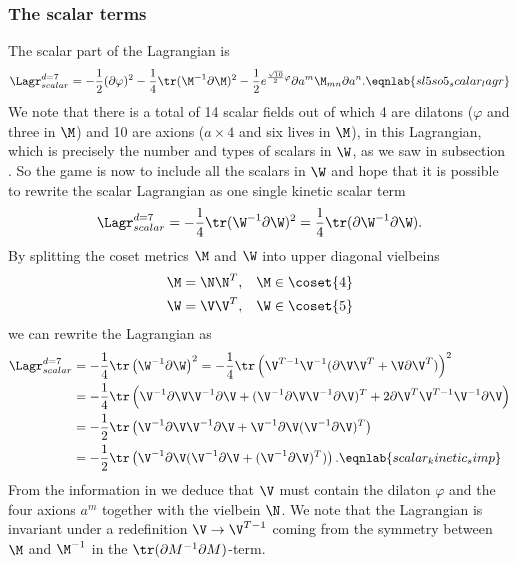 \subsubsection{The scalar terms}
The scalar part of the Lagrangian  is 
\begin{equation}
\Lagr_{scalar}^{d=7} = -\frac{1}{2}(\partial\varphi)^2-\frac{1}{4}\tr(\M^{-1}\partial \M)^2-\frac{1}{2}e^{\frac{\sqrt{10}}{2}\varphi}\partial a^m\M_{mn}\partial a^n.
\eqnlab{sl5so5_scalar_lagr}
\end{equation}
We note that there is a total of 14 scalar fields out of which 4 are dilatons ($\varphi$ and three in $\M$) and 10 are axions ($a\times 4$ and six lives in $\M$), in this Lagrangian, which is precisely the number and types of scalars in $\W$, as we saw in subsection .  
So the game is now to include all the scalars in $\W$ and hope that it is possible to rewrite the scalar Lagrangian as one single kinetic scalar term
\begin{equation}
\Lagr_{scalar}^{d=7} = -\frac{1}{4}\tr(\W^{-1}\partial \W)^2 = \frac{1}{4}\tr(\partial\W^{-1}\partial \W).
\end{equation}
By splitting the coset metrics $\M$ and $\W$ into upper diagonal vielbeins
\begin{align}
\M &= \N\N^T,&\M\in \mbox{\coset{4}}\nonumber\\
\W &= \V\V^T,&\W\in \mbox{\coset{5}}
\end{align}
we can rewrite the Lagrangian as
\begin{align}
\Lagr_{scalar}^{d=7} &= -\frac{1}{4}\tr\left(\W^{-1}\partial \W\right)^2 = -\frac{1}{4}\tr\left(\V^{T-1}\V^{-1}(\partial\V\V^T+\V\partial\V^T)\right)^2\nonumber\\
&=-\frac{1}{4}\tr\left(\V^{-1}\partial\V\V^{-1}\partial\V+(\V^{-1}\partial\V\V^{-1}\partial\V)^T+2\partial\V^T\V^{T-1}\V^{-1}\partial\V \right)\nonumber\\
&=-\frac{1}{2}\tr\left(\V^{-1}\partial\V\V^{-1}\partial\V+\V^{-1}\partial\V(\V^{-1}\partial\V)^T\right)\nonumber\\
&=-\frac{1}{2}\tr\left(\V^{-1}\partial\V(\V^{-1}\partial\V+(\V^{-1}\partial\V)^T)\right).
\eqnlab{scalar_kinetic_simp}
\end{align}
From the information in  we deduce that $\V$ must contain the dilaton $\varphi$ and the four axions $a^m$ together with the  vielbein $\N$.
We note that the Lagrangian  is invariant under a redefinition $\V\rightarrow\V^{T-1}$ coming from the symmetry between $\M$ and $\M^{-1}$ in the $\tr(\partial M^{-1}\partial M)$-term.

